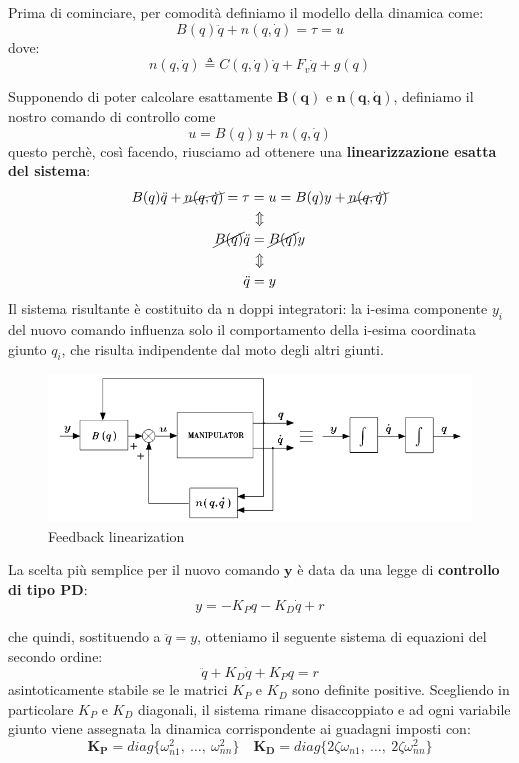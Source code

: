 Prima di cominciare, per comodità definiamo il modello della dinamica come:
\boldmath
\begin{equation}\label{eq:simplified_notation_dynamic}
B(q)\ddot{q} + n(q, \dot{q}) = \tau = u
\end{equation}
dove:
$$
n(q, \dot{q}) \triangleq C(q, \dot{q})\dot{q} + F_v\dot{q} + g(q)
$$
\unboldmath

Supponendo di poter calcolare esattamente $\mathbf{B(q)}$ e $\mathbf{n(q, \dot{q})}$, definiamo il nostro comando di controllo come
\boldmath
$$
u = B(q)y + n(q, \dot{q})
$$
questo perchè, così facendo, riusciamo ad ottenere una \textbf{linearizzazione esatta del sistema}:
\begin{gather*}
B(q)\ddot{q} + \cancel{n(q, \dot{q})} = \tau = u = B(q)y + \cancel{n(q, \dot{q})} \\
\Updownarrow \\
\cancel{B(q)}\ddot{q} = \cancel{B(q)}y \\
\Updownarrow \\
\ddot{q} = y
\end{gather*}
Il sistema risultante è costituito da n doppi integratori: la i-esima componente $y_i$ del nuovo comando influenza solo il comportamento della i-esima coordinata giunto $q_i$, che risulta indipendente dal moto degli altri giunti.


\begin{figure}[H]
	\centering
	\includegraphics[width=0.8\linewidth]{images/centralized_control_1}
	\caption{Feedback linearization}
	\label{fig:centralizedcontrol1}
\end{figure}

La scelta più semplice per il nuovo comando $\mathbf{y}$ è data da una legge di \textbf{controllo di tipo PD}:
$$
y = -K_P q - K_D \dot{q} + r
$$

che quindi, sostituendo a $\ddot{q} = y$, otteniamo il seguente sistema di equazioni del secondo ordine:
\begin{equation}\label{eq:2nd_order_dyn_feedback_lin}
\ddot{q} + K_D \dot{q} + K_P q = r
\end{equation}
asintoticamente stabile se le matrici $K_P$ e $K_D$ sono definite positive.
Scegliendo in particolare $K_P$ e $K_D$ diagonali, il sistema rimane disaccoppiato e ad ogni variabile giunto viene assegnata la dinamica corrispondente ai guadagni imposti con:
\unboldmath
$$
\mathbf{K_P} = diag\{\omega_{n1}^2, \ \dots, \ \omega_{nn}^2\}
\quad
\mathbf{K_D} = diag\{2\zeta\omega_{n1}, \ \dots, \ 2\zeta\omega_{nn}^2\}
$$

